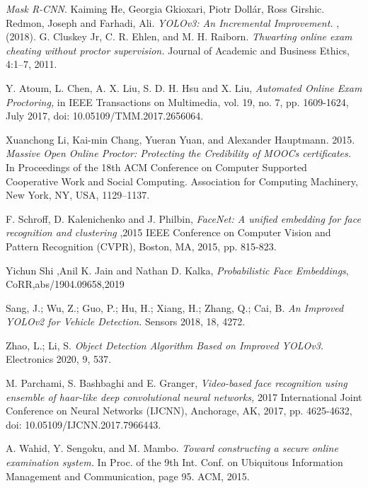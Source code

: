 \documentclass[12pt]{report}
\begin{document}
\begin{thebibliography}{9}
\textit {Mask R-CNN}.
Kaiming He, Georgia Gkioxari, Piotr Dollár, Ross Girshic.
Redmon, Joseph and Farhadi, Ali.
\textit{YOLOv3: An Incremental Improvement. }, 
 (2018). 
G. Cluskey Jr, C. R. Ehlen, and M. H. Raiborn.
\textit{Thwarting online exam
cheating without proctor supervision.} 
Journal of Academic and Business Ethics, 4:1–7, 2011.

Y. Atoum, L. Chen, A. X. Liu, S. D. H. Hsu and X. Liu, 
\textit{Automated Online Exam Proctoring,} 
in IEEE Transactions on Multimedia, vol. 19, no. 7, pp. 1609-1624, July 2017, doi: 10.05109/TMM.2017.2656064.

Xuanchong Li, Kai-min Chang, Yueran Yuan, and Alexander Hauptmann. 2015. 
\textit{Massive Open Online Proctor: Protecting the Credibility of MOOCs certificates.} 
 In Proceedings of the 18th ACM Conference on Computer Supported Cooperative Work and Social Computing. Association for Computing Machinery, New York, NY, USA, 1129–1137.

F. Schroff, D. Kalenichenko and J. Philbin, 
\textit{FaceNet: A unified embedding for face recognition and clustering} 
,2015 IEEE Conference on Computer Vision and Pattern Recognition (CVPR), Boston, MA, 2015, pp. 815-823.

Yichun Shi ,Anil K. Jain and Nathan D. Kalka,
\textit{Probabilistic Face Embeddings}, 
CoRR,abs/1904.09658,2019

Sang, J.; Wu, Z.; Guo, P.; Hu, H.; Xiang, H.; Zhang, Q.; Cai, B. 
\textit{An Improved YOLOv2 for Vehicle Detection.}
 Sensors 2018, 18, 4272.

Zhao, L.; Li, S.  
\textit{Object Detection Algorithm Based on Improved YOLOv3.}
Electronics 2020, 9, 537.

M. Parchami, S. Bashbaghi and E. Granger, 
\textit{Video-based face recognition using ensemble of haar-like deep convolutional neural networks,}
 2017 International Joint Conference on Neural Networks (IJCNN), Anchorage, AK, 2017, pp. 4625-4632, doi: 10.05109/IJCNN.2017.7966443.

 A. Wahid, Y. Sengoku, and M. Mambo.
\textit{Toward constructing a secure
online examination system.}
 In Proc. of the 9th Int. Conf. on Ubiquitous Information Management and Communication, page 95. ACM, 2015.


\end{thebibliography}
\end{document}
